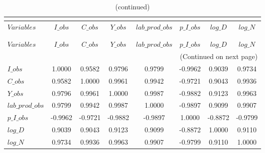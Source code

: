  
\begin{center}
\begin{longtable}{lccccccc} 
\caption{MATRIX OF CORRELATIONS}\\
 \label{Table:th_corr_matrix}\\
\toprule 
$Variables       $	 & 	 $           I\_obs$	 & 	 $           C\_obs$	 & 	 $           Y\_obs$	 & 	 $  lab\_prod\_obs$	 & 	 $       p\_I\_obs$	 & 	 $           log\_D$	 & 	 $           log\_N$\\
\midrule \endfirsthead 
\caption{(continued)}\\
 \toprule \\ 
$Variables       $	 & 	 $           I\_obs$	 & 	 $           C\_obs$	 & 	 $           Y\_obs$	 & 	 $  lab\_prod\_obs$	 & 	 $       p\_I\_obs$	 & 	 $           log\_D$	 & 	 $           log\_N$\\
\midrule \endhead 
\midrule \multicolumn{8}{r}{(Continued on next page)} \\ \bottomrule \endfoot 
\bottomrule \endlastfoot 
$I\_obs          $	 & 	            1.0000	 & 	            0.9582	 & 	            0.9796	 & 	            0.9799	 & 	           -0.9962	 & 	            0.9039	 & 	            0.9734 \\ 
$C\_obs          $	 & 	            0.9582	 & 	            1.0000	 & 	            0.9961	 & 	            0.9942	 & 	           -0.9721	 & 	            0.9043	 & 	            0.9936 \\ 
$Y\_obs          $	 & 	            0.9796	 & 	            0.9961	 & 	            1.0000	 & 	            0.9987	 & 	           -0.9882	 & 	            0.9123	 & 	            0.9963 \\ 
$lab\_prod\_obs  $	 & 	            0.9799	 & 	            0.9942	 & 	            0.9987	 & 	            1.0000	 & 	           -0.9897	 & 	            0.9099	 & 	            0.9907 \\ 
$p\_I\_obs       $	 & 	           -0.9962	 & 	           -0.9721	 & 	           -0.9882	 & 	           -0.9897	 & 	            1.0000	 & 	           -0.8872	 & 	           -0.9799 \\ 
$log\_D          $	 & 	            0.9039	 & 	            0.9043	 & 	            0.9123	 & 	            0.9099	 & 	           -0.8872	 & 	            1.0000	 & 	            0.9110 \\ 
$log\_N          $	 & 	            0.9734	 & 	            0.9936	 & 	            0.9963	 & 	            0.9907	 & 	           -0.9799	 & 	            0.9110	 & 	            1.0000 \\ 
\end{longtable}
 \end{center}
